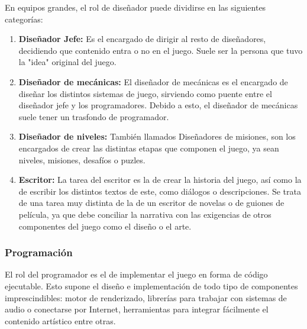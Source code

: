 En equipos grandes, el rol de diseñador puede dividirse en las siguientes categorías:
\begin{enumerate}
\item \textbf{Diseñador Jefe:} Es el encargado de dirigir al resto de diseñadores, decidiendo que contenido entra o no en el juego. Suele ser la persona que tuvo la "idea" original del juego.
\item \textbf{Diseñador de mecánicas:} El diseñador de mecánicas es el encargado de diseñar los distintos sistemas de juego, sirviendo como puente entre el diseñador jefe y los programadores. Debido a esto, el diseñador de mecánicas suele tener un trasfondo de programador.
\item \textbf{Diseñador de niveles:} También llamados Diseñadores de misiones, son los encargados de crear las distintas etapas que componen el juego, ya sean niveles, misiones, desafíos o puzles.
\item \textbf{Escritor:} La tarea del escritor es la de crear la historia del juego, así como la de escribir los distintos textos de este, como diálogos o descripciones. Se trata de una tarea muy distinta de la de un escritor de novelas o de guiones de película, ya que debe conciliar la narrativa con las exigencias de otros componentes del juego como el diseño o el arte.
\end{enumerate}

\subsubsection{Programación}
El rol del programador es el de implementar el juego en forma de código ejecutable. Esto supone el diseño e implementación de todo tipo de componentes imprescindibles: motor de renderizado, librerías para trabajar con sistemas de audio o conectarse por Internet, herramientas para integrar fácilmente el contenido artístico entre otras.

